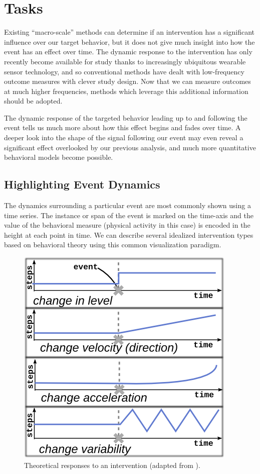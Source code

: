 \documentclass[review,journal]{vgtc}         %
\begin{document}
\section{Tasks}
Existing “macro-scale” methods can determine if an intervention has a significant influence over our target behavior, but it does not give much insight into how the event has an effect over time.
The dynamic response to the intervention has only recently become available for study thanks to increasingly ubiquitous wearable sensor technology, and so conventional methods have dealt with low-frequency outcome measures with clever study design.
Now that we can measure outcomes at much higher frequencies, methods which leverage this additional information should be adopted.

The dynamic response of the targeted behavior leading up to and following the event tells us much  more about how this effect begins and fades over time.
A deeper look into the shape of the signal following our event may even reveal a significant effect overlooked by our previous analysis, and much more quantitative behavioral models become possible.

\subsection{Highlighting Event Dynamics}
The dynamics surrounding a particular event are most commonly shown using a time series.
The instance or span of the event is marked on the time-axis and the value of the behavioral measure (physical activity in this case) is encoded in the height at each point in time.
We can describe several idealized intervention types based on behavioral theory using this common visualization paradigm.

\begin{figure}
\centering
\includegraphics[width=0.6\columnwidth]{./img/exampleDynamicSignals.png}
\caption{Theoretical responses to an intervention (adapted from \cite{glass1975}).}
\label{fig:exampleSignals}
\end{figure}
\end{document}
